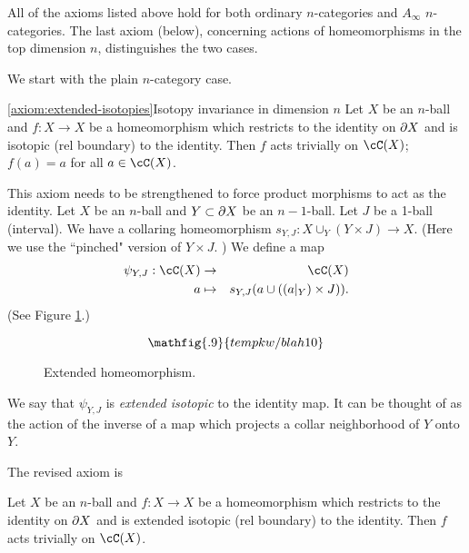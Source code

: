 All of the axioms listed above hold for both ordinary $n$-categories and $A_\infty$ $n$-categories.
The last axiom (below), concerning actions of 
homeomorphisms in the top dimension $n$, distinguishes the two cases.

We start with the plain $n$-category case.

\begin{preliminary-axiom}{\ref{axiom:extended-isotopies}}{Isotopy invariance in dimension $n$}
Let $X$ be an $n$-ball and $f: X\to X$ be a homeomorphism which restricts
to the identity on $\partial X$ and is isotopic (rel boundary) to the identity.
Then $f$ acts trivially on $\cC(X)$; $f(a) = a$ for all $a\in \cC(X)$.
\end{preliminary-axiom}

This axiom needs to be strengthened to force product morphisms to act as the identity.
Let $X$ be an $n$-ball and $Y\subset\partial X$ be an $n{-}1$-ball.
Let $J$ be a 1-ball (interval).
We have a collaring homeomorphism $s_{Y,J}: X\cup_Y (Y\times J) \to X$.
(Here we use the ``pinched" version of $Y\times J$.
)
We define a map
\begin{eqnarray*}
	\psi_{Y,J}: \cC(X) &\to& \cC(X) \\
	a & \mapsto & s_{Y,J}(a \cup ((a|_Y)\times J)) .
\end{eqnarray*}
(See Figure \ref{glue-collar}.)
\begin{figure}[!ht]
\begin{equation*}
\mathfig{.9}{tempkw/blah10}
\end{equation*}

\caption{Extended homeomorphism.}\label{glue-collar}\end{figure}
We say that $\psi_{Y,J}$ is {\it extended isotopic} to the identity map.
It can be thought of as the action of the inverse of
a map which projects a collar neighborhood of $Y$ onto $Y$.

The revised axiom is

\begin{axiom}
\label{axiom:extended-isotopies}
Let $X$ be an $n$-ball and $f: X\to X$ be a homeomorphism which restricts
to the identity on $\partial X$ and is extended isotopic (rel boundary) to the identity.
Then $f$ acts trivially on $\cC(X)$.
\end{axiom}

